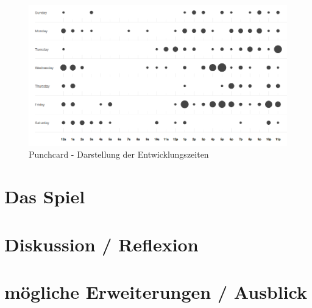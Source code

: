 \documentclass[12pt,a4paper]{scrartcl}
\begin{document}
\begin{figure}[h]
\centering
\includegraphics[scale=0.4]{img/punchcard.png}
\caption{Punchcard - Darstellung der Entwicklungszeiten}
\label{fig:punchcard}
\end{figure}

\section{Das Spiel}
\newpage
\section{Diskussion / Reflexion}

\newpage
\section{mögliche Erweiterungen / Ausblick}

\clearpage
\listoffigures
\end{document}
